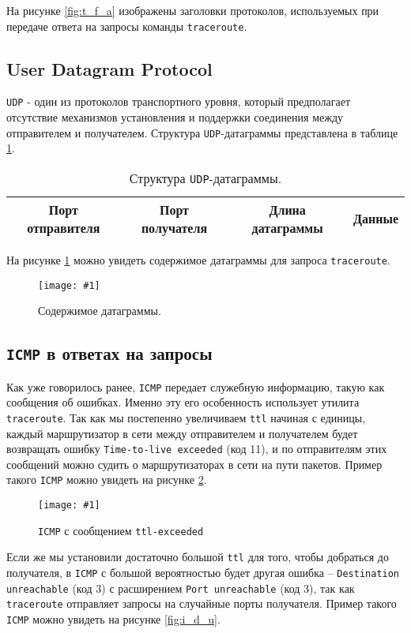\documentclass[12pt, a4paper]{article}
\newcommand{\figc}[4]{
  \begin{figure}[h]
  \begin{center}
    \texttt{[image: \#1]}
    \caption{#2}
    \label{fig:#3}
  \end{center}
  \end{figure}
}
\begin{document}
На рисунке \ref{fig:t_f_a} изображены заголовки протоколов, используемых при
передаче ответа на запросы команды \texttt{traceroute}.

\subsection{User Datagram Protocol}

\texttt{UDP} - один из протоколов транспортного уровня, который предполагает отсутствие
механизмов установления и поддержки соединения между отправителем и получателем.
Структура \texttt{UDP}-датаграммы представлена в таблице \ref{Tab:udp}.


\begin{table}[h]
\begin{center}
  \caption{Структура \texttt{UDP}-датаграммы.}
  \begin{tabular}{| c | c | c | c |}
    \hline
    Порт отправителя & Порт получателя & Длина датаграммы & Данные\\
    \hline
  \end{tabular}
  \label{Tab:udp}
\end{center}
\end{table}

На рисунке \ref{fig:t_u} можно увидеть содержимое датаграммы для запроса
\texttt{traceroute}.

\figc{trace_udp}{Содержимое датаграммы.}{t_u}{3.0}

\subsection{\texttt{ICMP} в ответах на запросы}

Как уже говорилось ранее, \texttt{ICMP} передает служебную информацию, такую
как сообщения об ошибках. Именно эту его особенность использует утилита
\texttt{traceroute}. Так как мы постепенно увеличиваем \texttt{ttl} начиная
с единицы, каждый маршрутизатор в сети между отправителем и получателем будет
возвращать ошибку \texttt{Time-to-live exceeded} (код 11), и по отправителям этих
сообщений можно судить о маршрутизаторах в сети на пути пакетов. Пример такого
\texttt{ICMP} можно увидеть на рисунке \ref{fig:i_t_e}.

\figc{icmp_ttl_exceeded}{\texttt{ICMP} с сообщением \texttt{ttl-exceeded}}{i_t_e}{3.0}

Если же мы установили достаточно большой \texttt{ttl} для того, чтобы добраться
до получателя, в \texttt{ICMP} с большой вероятностью будет другая ошибка --
\texttt{Destination unreachable} (код 3) с расширением \texttt{Port unreachable}
(код 3), так как \texttt{traceroute} отправляет запросы на случайные порты
получателя. Пример такого \texttt{ICMP} можно увидеть на рисунке \ref{fig:i_d_u}.
\end{document}
